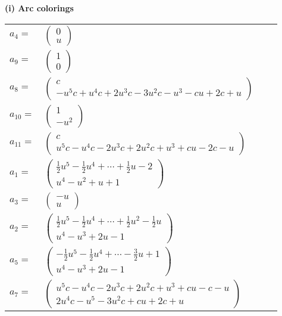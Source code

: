 \documentclass[1p]{elsarticle_modified}
\theoremstyle{definition}
\begin{document}
\flushleft \textbf{(i) Arc colorings}\\
\begin{tabular}{m{7pt} m{180pt} m{7pt} m{180pt} }
\flushright $a_{4}=$&$\begin{pmatrix}0\\u\end{pmatrix}$ \\
\flushright $a_{9}=$&$\begin{pmatrix}1\\0\end{pmatrix}$ \\
\flushright $a_{8}=$&$\begin{pmatrix}c\\- u^5 c+u^4 c+2 u^3 c-3 u^2 c- u^3- c u+2 c+u\end{pmatrix}$ \\
\flushright $a_{10}=$&$\begin{pmatrix}1\\- u^2\end{pmatrix}$ \\
\flushright $a_{11}=$&$\begin{pmatrix}c\\u^5 c- u^4 c-2 u^3 c+2 u^2 c+u^3+c u-2 c- u\end{pmatrix}$ \\
\flushright $a_{1}=$&$\begin{pmatrix}\frac{1}{2} u^5-\frac{1}{2} u^4+\cdots+\frac{1}{2} u-2\\u^4- u^2+u+1\end{pmatrix}$ \\
\flushright $a_{3}=$&$\begin{pmatrix}- u\\u\end{pmatrix}$ \\
\flushright $a_{2}=$&$\begin{pmatrix}\frac{1}{2} u^5-\frac{1}{2} u^4+\cdots+\frac{1}{2} u^2-\frac{1}{2} u\\u^4- u^3+2 u-1\end{pmatrix}$ \\
\flushright $a_{5}=$&$\begin{pmatrix}-\frac{1}{2} u^5-\frac{1}{2} u^4+\cdots-\frac{3}{2} u+1\\u^4- u^3+2 u-1\end{pmatrix}$ \\
\flushright $a_{7}=$&$\begin{pmatrix}u^5 c- u^4 c-2 u^3 c+2 u^2 c+u^3+c u- c- u\\2 u^4 c- u^5-3 u^2 c+c u+2 c+u\end{pmatrix}$ \\

\end{tabular}
\end{document}
